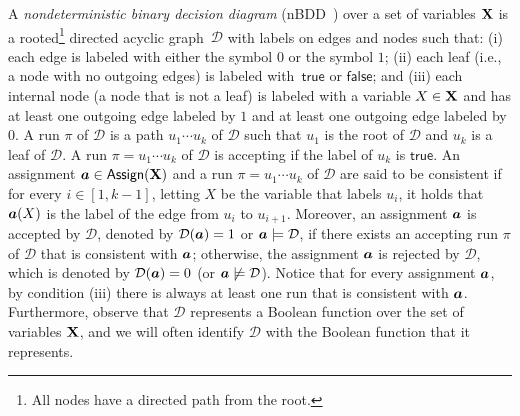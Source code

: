 \newcommand{\true}{\mathsf{true}}
\newcommand{\false}{\mathsf{false}}
\newcommand{\D}{\mathcal{D}}

\newcommand{\nbdd}{\textsf{nBDD}\xspace}
\newcommand{\ubdd}{\textsf{uBDD}\xspace}
\newcommand{\bdd}{\textsf{BDD}\xspace}

\newcommand{\nfbdd}{\textsf{nFBDD}\xspace}
\newcommand{\nobdd}{\textsf{nOBDD}\xspace}

\newcommand{\ndt}{\textsf{nDT}\xspace}

\newcommand{\ufbdd}{\textsf{uFBDD}\xspace}
\newcommand{\uobdd}{\textsf{uOBDD}\xspace}

\newcommand{\fbdd}{\textsf{FBDD}\xspace}
\newcommand{\obdd}{\textsf{OBDD}\xspace}

\newcommand{\udt}{\textsf{uDT}\xspace}
\newcommand{\ddt}{\textsf{DT}\xspace}

\newcommand{\nodt}{\textsf{nODT}\xspace}
\newcommand{\uodt}{\textsf{uODT}\xspace}
\newcommand{\odt}{\textsf{ODT}\xspace}




A \emph{nondeterministic binary decision
diagram} (\nbdd~\citep{BW97,ACMS20}) over  a
set of variables $\mathbf{X}$ is a rooted\footnote{All nodes have a directed path from the root.} directed
acyclic graph~$\D$ with labels on edges and
nodes such that: (i) each
edge is labeled with either the symbol $0$ or
the symbol $1$; (ii) each leaf (i.e., a node
with no outgoing edges) is labeled
with~$\true$ or $\false$; and (iii) each internal
node (a node that is not a leaf) is labeled
with a variable $X \in \mathbf{X}$ and has at least one outgoing edge labeled by $1$ and at least one outgoing edge labeled by $0$. A run $\pi$ of $\D$ is a path
$u_1 \cdots u_k$ of $\D$ such that $u_1$ is
the root of $\D$ and $u_k$ is a leaf of $\D$.
A run $\pi = u_1 \cdots u_k$ of $\D$ is
accepting if the label of $u_k$ is $\true$. An
assignment $\boldsymbol{a} \in \mathsf{Assign}(\mathbf{X})$ and a run
$\pi = u_1 \cdots u_k$ of $\D$ are said to be
consistent if for every $i \in [1, k-1]$, letting $X$ be the variable that labels $u_i$, it
holds that $\boldsymbol{a}(X)$ is the label of the edge
from $u_i$ to $u_{i+1}$. Moreover, an
assignment $\boldsymbol{a}$ is accepted by $\D$, denoted
by $\D(\as) = 1$ or $\as \models \D$, if there exists an accepting
run $\pi$ of $\D$ that is consistent with $\boldsymbol{a}$; otherwise, the
assignment $\boldsymbol{a}$ is rejected by $\D$, which is
denoted by $\D(\as) = 0$ (or $\as \not \models \D$). Notice that for every assignment $\boldsymbol{a}$, by condition (iii) there is always at least one run that is consistent with $\boldsymbol{a}$. Furthermore, observe that $\D$ represents a Boolean function over the set of variables $\mathbf{X}$, and we will often identify $\D$ with the Boolean function that it represents. 


